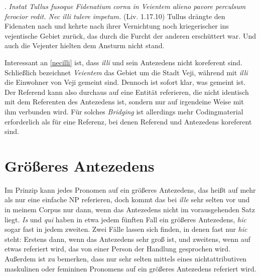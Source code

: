 \documentclass[12pt]{article}
\newcommand{\lat}[1]{\textit{#1}} %
\begin{document}
\ex.
\label{necilli}
\lat{Instat Tullus fusoque Fidenatium cornu in Veientem alieno pavore perculsum ferocior redit. Nec illi tulere impetum.} (Liv. 1.17.10)
\trans Tullus drängte den Fidenaten nach und kehrte nach ihrer Vernichtung noch kriegerischer ins vejentische Gebiet zurück, das durch die Furcht der anderen erschüttert war. Und auch die Vejenter hielten dem Ansturm nicht stand.


\noindent Interessant an \ref{necilli} ist, dass \lat{illi} und sein Antezedens nicht koreferent sind. Schließlich bezeichnet \lat{Veientem} das Gebiet um die Stadt Veji, während mit \lat{illi} die Einwohner von Veji gemeint sind. Dennoch ist sofort klar, was gemeint ist.
Der Referend kann also durchaus auf eine Entität referieren, die nicht identisch mit dem Referenten des Antezedens ist, sondern nur auf irgendeine Weise mit ihm verbunden wird.
Für solches \emph{Bridging} ist allerdings mehr Codingmaterial erforderlich als für eine Referenz, bei denen Referend und Antezedens koreferent sind.







\section{Größeres Antezedens}
\label{grInh}

Im Prinzip kann jedes Pronomen auf ein größeres Antezedens, das heißt auf mehr als nur eine einfache NP referieren, doch kommt das bei \lat{ille} sehr selten vor und in meinem Corpus nur dann, wenn das Antezedens nicht im vorausgehenden Satz liegt.
\lat{Is} und \lat{qui} haben in etwa jedem fünften Fall ein größeres Antezedens, \lat{hic} sogar fast in jedem zweiten.
Zwei Fälle lassen sich finden, in denen fast nur \lat{hic} steht: Erstens dann, wenn das Antezedens sehr groß ist, und zweitens, wenn auf etwas referiert wird, das von einer Person der Handlung gesprochen wird.
Außerdem ist zu bemerken, dass nur sehr selten mittels eines nichtattributiven maskulinen oder femininen Pronomens auf ein größeres Antezedens referiert wird.
\end{document}
